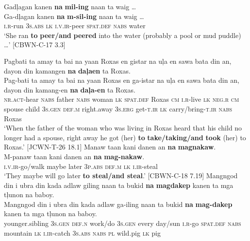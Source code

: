 \ea
\label{bkm:Ref474420325}
Gadļagan  kanen  \textbf{na}  \textbf{mil-ing}  naan  ta  waig … \smallskip\\
\gll Ga-dļagan  kanen  \textbf{na}  \textbf{m-sil-ing}  naan  ta  waig … \\
\textsc{i.r}-run  3\textsc{s.abs}  \textsc{lk}  \textsc{i.v.ir}-peer  \textsc{spat.def}  \textsc{nabs}  water \\
\glt ‘She ran \textbf{to} \textbf{peer/and} \textbf{peered} into the water (probably a pool or mud puddle) …’ [CBWN-C-17 3.3]
\z

\newpage
\ea
Pagbati  ta  amay  ta  bai  na  yaan  Roxas  en gistar  na  uļa  en  sawa  bata  din  an,  dayon  din  kamangen \textbf{na}  \textbf{daļaen}  ta  Roxas. \smallskip\\
\gll Pag-bati  ta  amay  ta  bai  na  yaan  Roxas  en ga-istar  na  uļa  en  sawa  bata  din  an,  dayon  din  kamang-en \textbf{na}  \textbf{daļa-en}  ta  Roxas. \\
\textsc{nr.act}-hear  \textsc{nabs}  father  \textsc{nabs}  woman  \textsc{lk}  \textsc{spat.def}  Roxas  \textsc{cm}
\textsc{i.r}-live  \textsc{lk}  \textsc{neg.r}  \textsc{cm}  spouse  child  3\textsc{s.gen}  \textsc{def.m}  right.away  3\textsc{s.erg}  get-\textsc{t.ir}
\textsc{lk}  carry/bring-\textsc{t.ir}  \textsc{nabs}  Roxas \\
\glt ‘When the father of the woman who was living in Roxas heard that his child no longer had a spouse, right away he got (her) \textbf{to} \textbf{take/taking/and} \textbf{took} (her) to Roxas.’ [JCWN-T-26 18.1]
\z
\ea
Manaw  taan  kani  danen  an  \textbf{na}  \textbf{magnakaw}. \smallskip\\
\gll M-panaw  taan  kani  danen  an  \textbf{na}  \textbf{mag-nakaw}. \\
\textsc{i.v.ir}-go/walk  maybe  later  3\textsc{p.abs}  \textsc{def.m}  \textsc{lk}  \textsc{i.ir}-steal \\
\glt ‘They maybe will go later \textbf{to steal/and steal}.’ [CBWN-C-18 7.19]
\z
\ea
Mangngod  din  i  ubra  din  kada  adlaw  giling naan  ta  bukid  \textbf{na}  \textbf{magdakep}  kanen  ta  mga  tļunon  na  baboy. \smallskip\\
\gll Mangngod  din  i  ubra  din  kada  adlaw  ga-iling naan  ta  bukid  \textbf{na}  \textbf{mag-dakep}  kanen  ta  mga  tļunon  na  baboy. \\
younger.sibling  3\textsc{s.gen}  \textsc{def.n}  work/do  3\textsc{s.gen}  every  day/sun  \textsc{i.r}-go
\textsc{spat.def}  \textsc{nabs}  mountain  \textsc{lk}  \textsc{i.ir}-catch  3\textsc{s.abs}  \textsc{nabs}  \textsc{pl}  wild.pig  \textsc{lk}  pig \\
